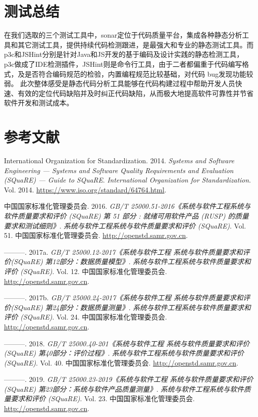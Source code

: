 \documentclass[hyperref, a4paper]{ctexart}
\begin{document}
\hypertarget{ux6d4bux8bd5ux603bux7ed3}{%
\section{测试总结}\label{ux6d4bux8bd5ux603bux7ed3}}

在我们选取的三个测试工具中，sonar定位于代码质量平台，集成各种静态分析工具和其它测试工具，提供持续代码检测跟进，是最强大和专业的静态测试工具。而p3c和JSHint分别是针对Java和JS开发的基于编码及设计实践的静态检测工具，p3c做成了IDE检测插件，JSHint则是命令行工具，由于二者都偏重于代码编写格式，及是否符合编码规范的检验，内置编程规范比较基础，对代码
bug发现功能较弱。
此次整体感受是静态代码分析工具能够在代码构建过程中帮助开发人员快速、有效的定位代码缺陷并及时纠正代码缺陷，从而极大地提高软件可靠性并节省软件开发和测试成本。

\pagebreak

\hypertarget{ux53c2ux8003ux6587ux732e}{%
\section*{参考文献}\label{ux53c2ux8003ux6587ux732e}}

\hypertarget{refs}{}
\leavevmode\hypertarget{ref-innovativeInternationalisation}{}%
International Organization for Standardization. 2014. \emph{Systems and
Software Engineering --- Systems and Software Quality Requirements and
Evaluation (SQuaRE) --- Guide to SQuaRE}. \emph{International
Organization for Standardization}. Vol. 2014.
\url{https://www.iso.org/standard/64764.html}.

\leavevmode\hypertarget{ref-innovative1}{}%
中国国家标准化管理委员会. 2016. \emph{GB/T
25000.51-2016《系统与软件工程系统与软件质量要求和评价 (SQuaRE) 第 51
部分 : 就绪可用软件产品 (RUSP) 的质量要求和测试细则》}.
\emph{系统与软件工程系统与软件质量要求和评价 (SQuaRE)}. Vol. 51.
中国国家标准化管理委员会. \url{http://openstd.samr.gov.cn}.

\leavevmode\hypertarget{ref-innovative3}{}%
---------. 2017a. \emph{GB/T 25000.12-2017《系统与软件工程
系统与软件质量要求和评价(SQuaRE) 第12部分：数据质量模型》}.
\emph{系统与软件工程系统与软件质量要求和评价 (SQuaRE)}. Vol. 12.
中国国家标准化管理委员会. \url{http://openstd.samr.gov.cn}.

\leavevmode\hypertarget{ref-innovative4}{}%
---------. 2017b. \emph{GB/T 25000.24-2017《系统与软件工程
系统与软件质量要求和评价(SQuaRE) 第24部分：数据质量测量》}.
\emph{系统与软件工程系统与软件质量要求和评价 (SQuaRE)}. Vol. 24.
中国国家标准化管理委员会. \url{http://openstd.samr.gov.cn}.

\leavevmode\hypertarget{ref-innovative5}{}%
---------. 2018. \emph{GB/T 25000.40-201《系统与软件工程
系统与软件质量要求和评价(SQuaRE) 第40部分：评价过程》}.
\emph{系统与软件工程系统与软件质量要求和评价 (SQuaRE)}. Vol. 40.
中国国家标准化管理委员会. \url{http://openstd.samr.gov.cn}.

\leavevmode\hypertarget{ref-innovative2}{}%
---------. 2019. \emph{GB/T 25000.23-2019《系统与软件工程
系统与软件质量要求和评价(SQuaRE) 第23部分：系统与软件产品质量测量》}.
\emph{系统与软件工程系统与软件质量要求和评价 (SQuaRE)}. Vol. 23.
中国国家标准化管理委员会. \url{http://openstd.samr.gov.cn}.
\end{document}

